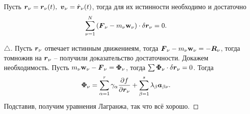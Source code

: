 Пусть $\vc{r}_\nu = \vc{r}_\nu (t), \ \vc{v}_\nu = \dot{\vc{r}}_\nu(t)$, тогда для их истинности необходимо и достаточно
\begin{equation*}
    \sum_{\nu=1}^N \left(
        \mbox{\boldmath $F$}_\nu - m_\nu \mbox{\boldmath $\mathrm{w}$}_\nu
    \right) \cdot \delta \mbox{\boldmath $r$}_\nu = 0.
\end{equation*}


\begin{proof}[$\triangle$]
    Пусть $\mbox{\boldmath $r$}_\nu$ отвечает истинным движениеям, тогда $\mbox{\boldmath $F$}_\nu - m_\nu \mbox{\boldmath $\mathrm{w}$}_\nu = - \mbox{\boldmath $R$}_\nu$, тогда томножив на $\mbox{\boldmath $r$}_\nu$ -- получили доказательство достаточности.
    Докажем необходимость. Пусть $m_\nu \mbox{\boldmath $\mathrm{w}$}_\nu - \mbox{\boldmath $F$}_\nu = \mbox{\boldmath $\Phi$}_\nu$, тогда $\sum \mbox{\boldmath $\Phi$}_\nu \cdot \delta \mbox{\boldmath $r$}_\nu = 0$. Тогда 
    \begin{equation*}
        \mbox{\boldmath $\Phi$}_\nu = \sum_{\alpha=1}^r \gamma_\alpha \frac{\partial f}{\partial \mbox{\boldmath $r$}_\nu} 
        + \sum_{\beta=1}^s \lambda_\beta \mbox{\boldmath $a$}_{\beta \nu}.
    \end{equation*}
    Подставив, получим уравнения Лагранжа, так что всё хорошо.
\end{proof}






























